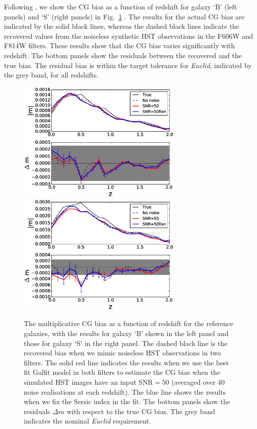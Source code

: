 \documentclass[useAMS,usenatbib]{mnras}
\begin{document}
Following , we show the CG bias as a function of redshift for galaxy `B' (left panels) and `S' (right panels) in Fig.~\ref{fig:biasofz50} . The results for the actual CG bias are indicated by the solid black lines, whereas the dashed black lines indicate the recovered values from the noiseless synthetic HST observations in the F606W and F814W filters. These results show that the CG bias varies significantly with redshift. The bottom panels show the residuals between the recovered and the true bias. The residual bias is within the target tolerance for {\it Euclid}, indicated by the grey band, for all redshifts.

\begin{figure}
  \includegraphics[width=8.0cm]{zs2n_b_snrtt50.eps}
  \includegraphics[width=8.0cm]{zs2n_s_snrtt50.eps}
\caption{The multiplicative CG bias as a function of redshift
  for the reference galaxies, with the results for galaxy `B' shown
  in the left panel and those for galaxy `S' in the right panel.
  The dashed black line is the recovered bias when we mimic 
  noiseless HST observations in two filters. The solid red line
  indicates the results when we use the best fit {\sc Galfit} model
  in both filters to estimate the CG bias when the simulated HST images have
  an input SNR$=50$ (averaged over 40 noise realisations at each
  redshift). The blue line shows the results when we fix the Sersic index
  in the fit. The bottom panels show the residuals $\Delta m$ with respect
  to the true CG bias. The grey band indicates the 
  nominal {\it Euclid} requirement.}
\label{fig:biasofz50}
\end{figure}
\end{document}
